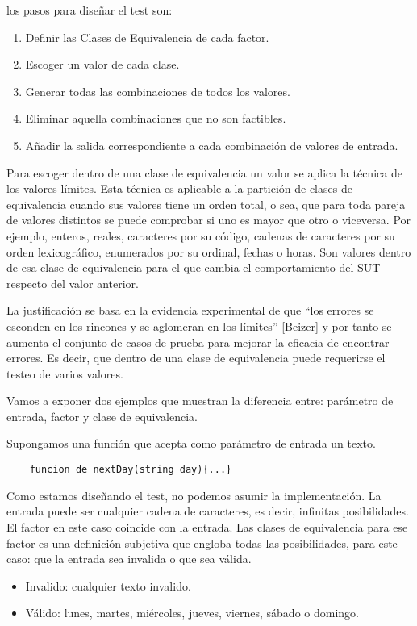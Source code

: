 los pasos para diseñar el test son:
\begin{enumerate}
    \item Definir las Clases de Equivalencia de cada factor.
    \item Escoger un valor de cada clase.
    \item Generar todas las combinaciones de todos los valores.
    \item Eliminar aquella combinaciones que no son factibles.
    \item Añadir la salida correspondiente a cada combinación de valores de entrada.
\end{enumerate}

Para escoger dentro de una clase de equivalencia un valor se aplica la técnica de los valores límites.
Esta técnica es aplicable a la partición de clases de equivalencia cuando sus valores tiene un orden total, o sea, que para toda pareja de valores distintos se puede comprobar si uno es mayor que otro o viceversa.
Por ejemplo, enteros, reales, caracteres por su código, cadenas de caracteres por su orden lexicográfico, enumerados por su ordinal, fechas o horas.
Son valores dentro de esa clase de equivalencia para el que cambia el comportamiento del SUT respecto del valor anterior.

La justificación se basa en la evidencia experimental de que “los errores se esconden en los rincones y se aglomeran en los límites” [Beizer] y por tanto se aumenta el conjunto de casos de prueba para mejorar la eficacia de encontrar errores.
Es decir, que dentro de una clase de equivalencia puede requerirse el testeo de varios valores.

Vamos a exponer dos ejemplos que muestran la diferencia entre: parámetro de entrada, factor y clase de equivalencia.

Supongamos una función que acepta como parámetro de entrada un texto.

\begin{verbatim}
    funcion de nextDay(string day){...}
\end{verbatim}

Como estamos diseñando el test, no podemos asumir la implementación.
La entrada puede ser cualquier cadena de caracteres, es decir, infinitas posibilidades.
El factor en este caso coincide con la entrada.
Las clases de equivalencia para ese factor es una definición subjetiva que engloba todas las posibilidades, para este caso: que la entrada sea invalida o que sea válida.
\begin{itemize}
    \item Invalido: cualquier texto invalido.
    \item Válido: lunes, martes, miércoles, jueves, viernes, sábado o domingo.
\end{itemize}

